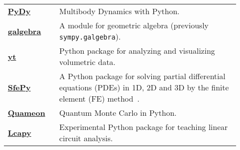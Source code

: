 \begin{longtable}[htbc]{>{\raggedright}p{0.2\linewidth}p{0.74\linewidth}}
\href{http://www.pydy.org/}{\textbf{PyDy}}~\cite{gede2013constrained} & Multibody Dynamics with
  Python. \\

\href{https://github.com/brombo/galgebra}{\textbf{galgebra}}~\cite{galgebra} &
  A module for geometric algebra (previously \texttt{sympy.galgebra}). \\

\href{http://yt-project.org/}{\textbf{yt}}~\cite{2011ApJS..192....9T} & Python package for
  analyzing and visualizing volumetric data. \\

\href{http://sfepy.org/}{\textbf{SfePy}}~\cite{cimrman2014sfepy} &
  A Python package for solving partial
  differential equations (PDEs) in 1D, 2D and 3D by the finite element (FE)
  method~\cite{Zienkiewicz2013FEM}. \\

\href{http://quameon.sourceforge.net/}{\textbf{Quameon}}~\cite{quameon} & Quantum
  Monte Carlo in Python. \\

\href{http://lcapy.elec.canterbury.ac.nz/}{\textbf{Lcapy}}~\cite{lcapy} &
  Experimental Python package for teaching linear circuit analysis. \\
\bottomrule
\end{longtable}
